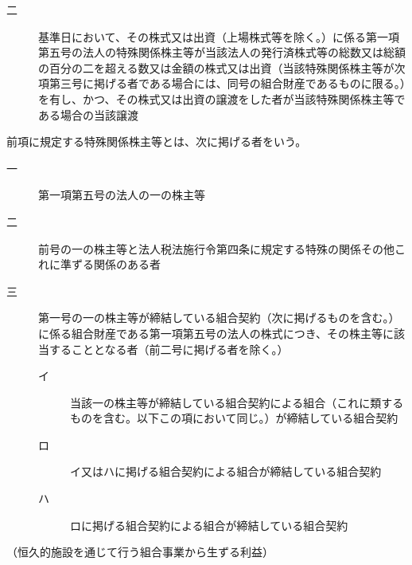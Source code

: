 \documentclass[twocolumn,a4j,10pt]{ltjtarticle}
\begin{document}
\begin{description}
\begin{description}
\item[二]基準日において、その株式又は出資（上場株式等を除く。）に係る第一項第五号の法人の特殊関係株主等が当該法人の発行済株式等の総数又は総額の百分の二を超える数又は金額の株式又は出資（当該特殊関係株主等が次項第三号に掲げる者である場合には、同号の組合財産であるものに限る。）を有し、かつ、その株式又は出資の譲渡をした者が当該特殊関係株主等である場合の当該譲渡
\end{description}
\item[\rensuji{10}]前項に規定する特殊関係株主等とは、次に掲げる者をいう。
\begin{description}
\item[一]第一項第五号の法人の一の株主等
\item[二]前号の一の株主等と法人税法施行令第四条に規定する特殊の関係その他これに準ずる関係のある者
\item[三]第一号の一の株主等が締結している組合契約（次に掲げるものを含む。）に係る組合財産である第一項第五号の法人の株式につき、その株主等に該当することとなる者（前二号に掲げる者を除く。）
\begin{description}
\item[イ]当該一の株主等が締結している組合契約による組合（これに類するものを含む。以下この項において同じ。）が締結している組合契約
\item[ロ]イ又はハに掲げる組合契約による組合が締結している組合契約
\item[ハ]ロに掲げる組合契約による組合が締結している組合契約
\end{description}
\end{description}
\end{description}
\noindent\hspace{10pt}（恒久的施設を通じて行う組合事業から生ずる利益）
\end{document}

